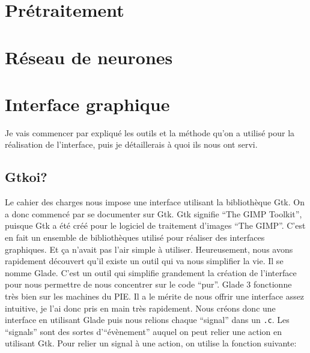 \documentclass[]{report}
\begin{document}
	\chapter{Pr\'etraitement} %
	\label{cha:pr'etraitement}




	\chapter{R\'eseau de neurones} %
	\label{cha:r'eseau_de_neurones}




	\chapter{Interface graphique} %
	\label{cha:interface_graphique}
	Je vais commencer par expliqu\'e les outils et la m\'ethode qu'on a utilis\'e pour la r\'ealisation de l'interface, puis je d\'etaillerais \`a quoi ils nous ont servi.
		\section{Gtkoi?} %
		\label{sec:gtkoi_}
			Le cahier des charges nous impose une interface utilisant la biblioth\`eque Gtk. On a donc commenc\'e par se documenter sur Gtk.
			Gtk signifie ``The GIMP Toolkit'', puisque Gtk a \'et\'e cr\'e\'e pour le logiciel de traitement d'images ``The GIMP''. C'est en fait un ensemble de biblioth\`eques utilis\'e pour r\'ealiser des interfaces graphiques. Et \c ca n'avait pas l'air simple \`a utiliser.
			Heureusement, nous avons rapidement d\'ecouvert qu'il existe un outil qui va nous simplifier la vie. Il se nomme Glade. C'est un outil qui simplifie grandement la cr\'eation de l'interface pour nous permettre de nous concentrer sur le code ``pur''. Glade 3 fonctionne tr\`es bien sur les machines du PIE. Il a le m\'erite de nous offrir une interface assez intuitive, je l'ai donc pris en main tr\`es rapidement.
			Nous cr\'eons donc une interface en utilisant Glade puis nous relions chaque ``signal'' dans un \texttt{.c}. Les ``signals'' sont des sortes d'``\'ev\`enement'' auquel on peut relier une action en utilisant Gtk.
			Pour relier un signal \`a une action, on utilise la fonction suivante:
\end{document}
